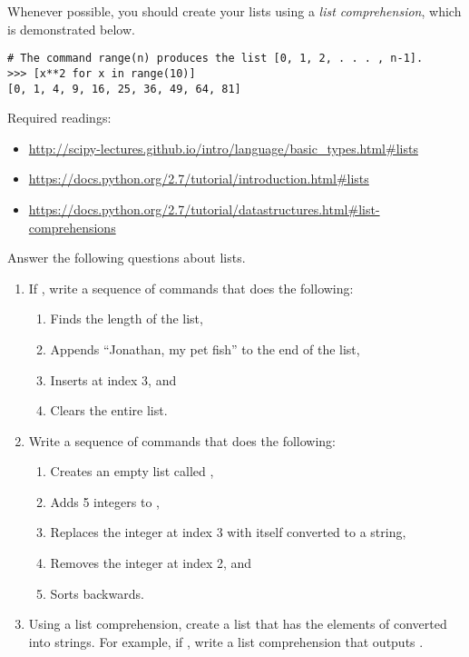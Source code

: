 Whenever possible, you should create your lists using a \emph{list comprehension}, which is demonstrated below.
\begin{lstlisting}
# The command range(n) produces the list [0, 1, 2, . . . , n-1].
>>> [x**2 for x in range(10)]
[0, 1, 4, 9, 16, 25, 36, 49, 64, 81]
\end{lstlisting}



Required readings: 
\begin{itemize}
\item \url{http://scipy-lectures.github.io/intro/language/basic_types.html#lists} 
\item \url{https://docs.python.org/2.7/tutorial/introduction.html#lists}
\item \url{https://docs.python.org/2.7/tutorial/datastructures.html#list-comprehensions}
\end{itemize}

\begin{problem}
Answer the following questions about lists.

\begin{enumerate}
\item If , write a sequence of commands that does the following:
\begin{enumerate}
\item Finds the length of the list,
\item Appends ``Jonathan, my pet fish'' to the end of the list,
\item Inserts  at index 3, and
\item Clears the entire list.
\end{enumerate}
\item Write a sequence of commands that does the following:
\begin{enumerate}
\item Creates an empty list called ,
\item Adds 5 integers to ,
\item Replaces the integer at index 3 with itself converted to a string,
\item Removes the integer at index 2, and
\item Sorts  backwards.
\end{enumerate}
\item Using a list comprehension, create a list that has the elements of  converted into strings. For example, if , write a list comprehension that outputs .
\end{enumerate}

\end{problem}



